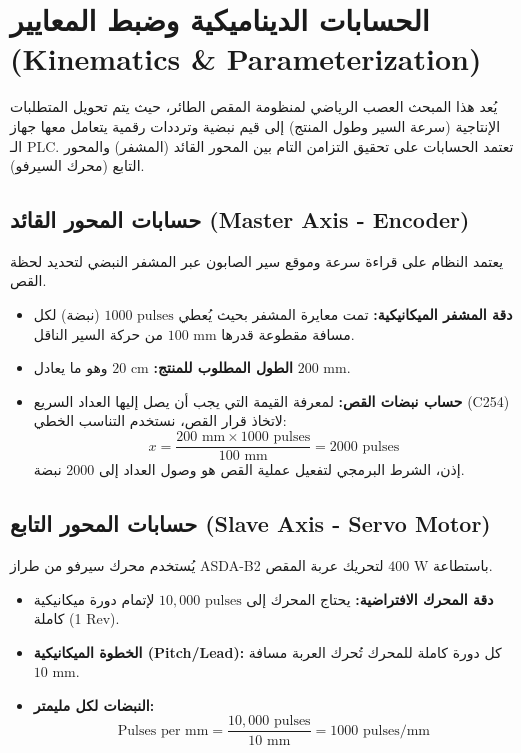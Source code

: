 \section{الحسابات الديناميكية وضبط المعايير \textenglish{(Kinematics \& Parameterization)}}
\label{sec:kinematics_and_parameters}

يُعد هذا المبحث العصب الرياضي لمنظومة المقص الطائر، حيث يتم تحويل المتطلبات الإنتاجية (سرعة السير وطول المنتج) إلى قيم نبضية وترددات رقمية يتعامل معها جهاز الـ \textenglish{PLC}. تعتمد الحسابات على تحقيق التزامن التام بين المحور القائد (المشفر) والمحور التابع (محرك السيرفو).

\subsection{حسابات المحور القائد \textenglish{(Master Axis - Encoder)}}
يعتمد النظام على قراءة سرعة وموقع سير الصابون عبر المشفر النبضي لتحديد لحظة القص.
\begin{itemize}
    \item \textbf{دقة المشفر الميكانيكية:} تمت معايرة المشفر بحيث يُعطي $1000\text{ pulses}$ (نبضة) لكل مسافة مقطوعة قدرها $100\text{ mm}$ من حركة السير الناقل.
    \item \textbf{الطول المطلوب للمنتج:} $20\text{ cm}$ وهو ما يعادل $200\text{ mm}$.
    \item \textbf{حساب نبضات القص:} لمعرفة القيمة التي يجب أن يصل إليها العداد السريع (\textenglish{C254}) لاتخاذ قرار القص، نستخدم التناسب الخطي:
    $$x = \frac{200\text{ mm} \times 1000\text{ pulses}}{100\text{ mm}} = 2000\text{ pulses}$$
    إذن، الشرط البرمجي لتفعيل عملية القص هو وصول العداد إلى $2000$ نبضة.
\end{itemize}

\subsection{حسابات المحور التابع \textenglish{(Slave Axis - Servo Motor)}}
يُستخدم محرك سيرفو من طراز \textenglish{ASDA-B2} باستطاعة $400\text{ W}$ لتحريك عربة المقص.
\begin{itemize}
    \item \textbf{دقة المحرك الافتراضية:} يحتاج المحرك إلى $10,000\text{ pulses}$ لإتمام دورة ميكانيكية كاملة (\textenglish{1 Rev}).
    \item \textbf{الخطوة الميكانيكية (\textenglish{Pitch/Lead}):} كل دورة كاملة للمحرك تُحرك العربة مسافة $10\text{ mm}$.
    \item \textbf{النبضات لكل مليمتر:} 
    $$\text{Pulses per mm} = \frac{10,000\text{ pulses}}{10\text{ mm}} = 1000\text{ pulses/mm}$$
\end{itemize}

